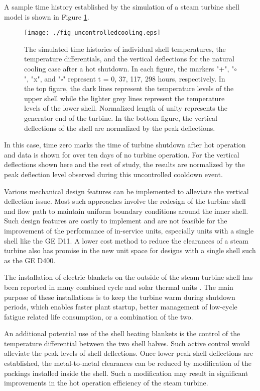 \documentclass[a4paper, 10pt, conference]{ieeeconf}      %
\begin{document}
A sample time history established by the simulation of a steam turbine shell model is shown in Figure \ref{fig:Uncontrolled-results}. 
\begin{figure}
\centering{}\texttt{[image: ./fig\_uncontrolledcooling.eps]}
\caption{\label{fig:Uncontrolled-results}The simulated time histories of individual shell temperatures, the temperature differentials, and the vertical deflections for the natural cooling case after a hot shutdown. In each figure, the markers "+", "$\circ$", "x", and "$\square$" represent t = 0, 37, 117, 298 hours, respectively. In the top figure, the dark lines represent the temperature levels of the upper shell while the lighter grey lines represent the temperature levels of the lower shell. Normalized length of unity represents the generator end of the turbine. In the bottom figure, the vertical deflections of the shell are normalized by the peak deflections.}
\end{figure}
In this case, time zero marks the time of turbine shutdown after hot operation and data is shown for over ten days of no turbine operation. For the vertical deflections shown here and the rest of study, the results are normalized by the peak deflection level observed during this uncontrolled cooldown event.

Various mechanical design features can be implemented to alleviate the vertical deflection issue. Most such approaches involve the redesign of the turbine shell and flow path to maintain uniform boundary conditions around the inner shell. Such design features are costly to implement and are not feasible for the improvement of the performance of in-service units, especially units with a single shell like the GE D11. A lower cost method to reduce the clearances of a steam turbine also has promise in the new unit space for designs with a single shell such as the GE D400. 

The installation of electric blankets on the outside of the steam turbine shell has been reported in many combined cycle and solar thermal units \cite{Spelling2011,Spelling2012}. The main purpose of these installations is to keep the turbine warm during shutdown periods, which enables faster plant startup, better management of low-cycle fatigue related life consumption, or a combination of the two. 

An additional potential use of the shell heating blankets is the control of the temperature differential between the two shell halves. Such active control would alleviate the peak levels of shell deflections. Once lower peak shell deflections are established, the metal-to-metal clearances can be reduced by modification of the packings installed inside the shell. Such a modification may result in significant improvements in the hot operation efficiency of the steam turbine.
\end{document}
